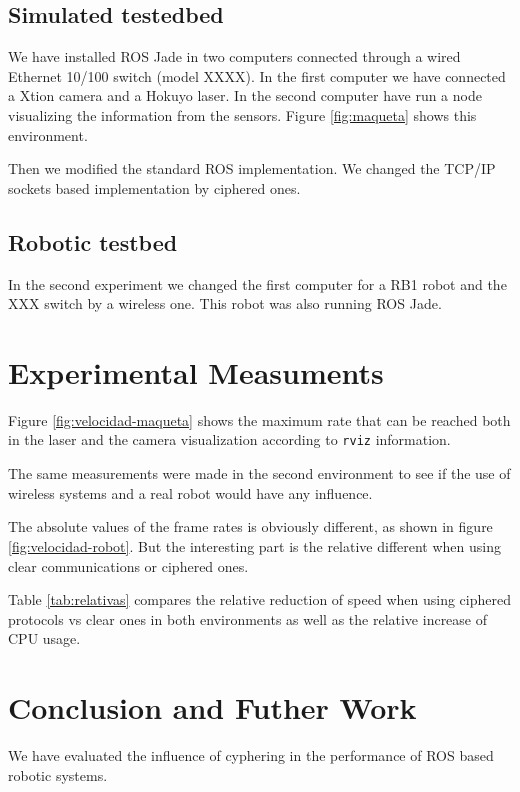 \documentclass[journal,twoside]{JoPhA}
\begin{document}
\subsection{Simulated testedbed}

We have installed ROS Jade in two computers connected through a wired Ethernet 10/100 switch (model XXXX). In the first computer we have connected a Xtion camera and a Hokuyo laser. In the second computer have run a node visualizing the information from the sensors. Figure \ref{fig:maqueta} shows this environment.


Then we modified the standard ROS implementation. We changed the TCP/IP sockets based implementation by ciphered ones.


\subsection{Robotic testbed}

In the second experiment we changed the first computer for a RB1 robot and the XXX switch by a wireless one. This robot was also running ROS Jade.



\section{Experimental Measuments}

Figure \ref{fig:velocidad-maqueta} shows the maximum rate that can be reached both in the laser and the camera visualization according to \texttt{rviz} information.

The same measurements were made in the second environment to see if the use of wireless systems and a real robot would have any influence.

The absolute values of the frame rates is obviously different, as shown in figure \ref{fig:velocidad-robot}. But the interesting part is the relative different when using clear communications or ciphered ones. 

Table \ref{tab:relativas}  compares the relative reduction of speed when using ciphered protocols vs clear ones in both environments as well as the relative increase of CPU usage.

\section{Conclusion and Futher Work}

We have evaluated the influence of cyphering in the performance of ROS based robotic systems.
\end{document}
